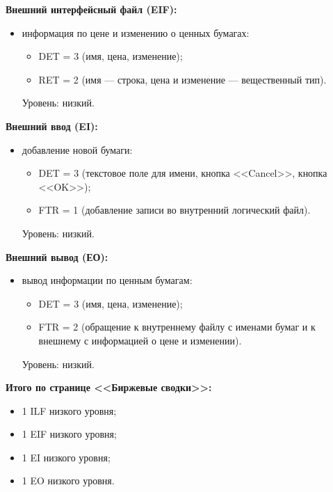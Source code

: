 \documentclass{bmstu}
\begin{document}
\textbf{Внешний интерфейсный файл (EIF):}

\begin{itemize}
    \item информация по цене и изменению о ценных бумагах:
    \begin{itemize}
        \item DET = 3 (имя, цена, изменение);
        \item RET = 2 (имя --- строка, цена и изменение --- вещественный тип).
    \end{itemize}
    Уровень: низкий.
\end{itemize}

\textbf{Внешний ввод (EI):}

\begin{itemize}
    \item добавление новой бумаги:
    \begin{itemize}
        \item DET = 3 (текстовое поле для имени, кнопка <<Cancel>>, кнопка <<OK>>);
        \item FTR = 1 (добавление записи во внутренний логический файл).
    \end{itemize}
    Уровень: низкий.
\end{itemize}

\textbf{Внешний вывод (ЕО):}

\begin{itemize}
    \item вывод информации по ценным бумагам:
    \begin{itemize}
        \item DET = 3 (имя, цена, изменение);
        \item FTR = 2 (обращение к внутреннему файлу с именами бумаг и к внешнему с информацией о цене и изменении).
    \end{itemize}
    Уровень: низкий.
\end{itemize}

\textbf{Итого по странице <<Биржевые сводки>>:}

\begin{itemize}
    \item 1 ILF низкого уровня;
    \item 1 EIF низкого уровня;
    \item 1 EI низкого уровня;
    \item 1 EO низкого уровня.
\end{itemize}

\clearpage
\end{document}
